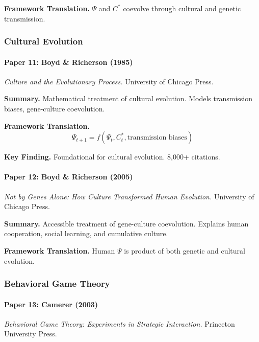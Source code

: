 \textbf{Framework Translation.}
$\Psi$ and $C^*$ coevolve through cultural and genetic transmission.

\subsubsection{Cultural Evolution}

\paragraph{Paper 11: Boyd \& Richerson (1985)}

\textit{Culture and the Evolutionary Process.}
University of Chicago Press.

\textbf{Summary.}
Mathematical treatment of cultural evolution. Models transmission biases, 
gene-culture coevolution.

\textbf{Framework Translation.}
\begin{equation}
\Psi_{t+1} = f(\Psi_t, C^*_t, \text{transmission biases})
\end{equation}

\textbf{Key Finding.}
Foundational for cultural evolution. 8,000+ citations.

\paragraph{Paper 12: Boyd \& Richerson (2005)}

\textit{Not by Genes Alone: How Culture Transformed Human Evolution.}
University of Chicago Press.

\textbf{Summary.}
Accessible treatment of gene-culture coevolution. Explains human 
cooperation, social learning, and cumulative culture.

\textbf{Framework Translation.}
Human $\Psi$ is product of both genetic and cultural evolution.

\subsubsection{Behavioral Game Theory}

\paragraph{Paper 13: Camerer (2003)}

\textit{Behavioral Game Theory: Experiments in Strategic Interaction.}
Princeton University Press.

